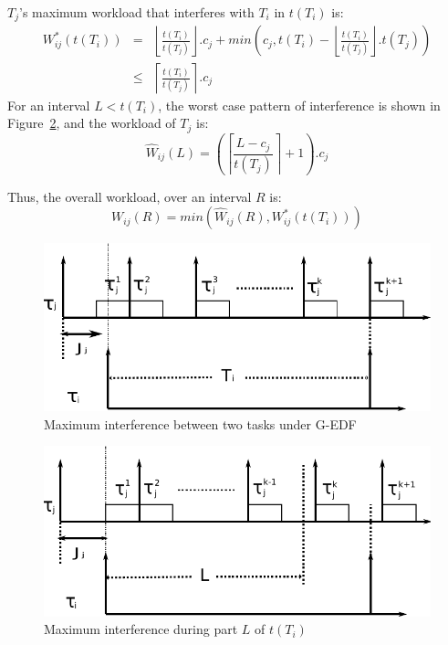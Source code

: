 \documentclass[a4paper,english]{article}
\begin{document}
$T_j$'s maximum workload that interferes with $T_i$ in $t(T_{i})$ is:
\begin{eqnarray}
W_{ij}^{*}\left(t\left(T_{i}\right)\right) & = & \left\lfloor\frac{t\left(T_{i}\right)}{t\left(T_{j}\right)}\right\rfloor .c_{j}+min\left(c_{j},t\left(T_{i}\right)-\left\lfloor\frac{t\left(T_{i}\right)}{t\left(T_{j}\right)}\right\rfloor .t\left(T_{j}\right)\right)\nonumber \\
 & \le & \left\lceil\frac{t\left(T_{i}\right)}{t\left(T_{j}\right)}\right\rceil .c_{j}
 \label{eq11}\end{eqnarray}
For an interval $L<t(T_{i})$, the worst case pattern of interference
is shown in Figure~\ref{fig2}, and the workload of $T_{j}$ is:
\begin{equation}
\hat{W}{}_{ij}\left(L\right)=\left(\left\lceil\frac{L-c_{j}}{t\left(T_{j}\right)}\right\rceil+1\right).c_{j}\label{eq12}\end{equation}

Thus, the overall workload, over an interval $R$ is:
\begin{equation}
W_{ij}\left(R\right)=min\left(\hat{W}_{ij}\left(R\right),W_{ij}^{*}\left(t\left(T_{i}\right)\right)\right)\label{eq13}\end{equation}


\begin{figure}%
\centering
\includegraphics[bb=0bp 0bp 542bp 162bp,scale=0.5]{figures/figure9-a}
\caption{\label{fig1} Maximum interference between two tasks under G-EDF}
\end{figure}


\begin{figure}
\centering
\includegraphics[bb=0bp 0bp 542bp 162bp,scale=0.5]{figures/figure9-b}
\caption{\label{fig2}Maximum interference during part $L$ of $t(T_{i})$}
\end{figure}
\end{document}
